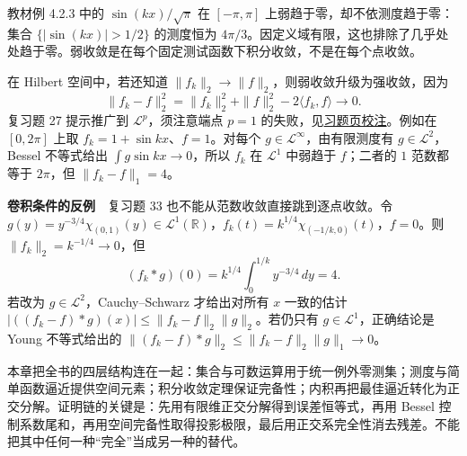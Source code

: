 \documentclass[11pt,a4paper]{article}
\begin{document}
教材例 4.2.3 中的 \(\sin(kx)/\sqrt\pi\) 在 \([-\pi,\pi]\)
上弱趋于零，却不依测度趋于零：集合 \(\{|\sin(kx)|>1/2\}\) 的测度恒为
\(4\pi/3\)。因定义域有限，这也排除了几乎处处趋于零。弱收敛是在每个固定测试函数下积分收敛，不是在每个点收敛。

在 Hilbert 空间中，若还知道
\(\|f_k\|_2\to\|f\|_2\)，则弱收敛升级为强收敛，因为 \[
\|f_k-f\|_2^2=\|f_k\|_2^2+\|f\|_2^2-2\langle f_k,f\rangle\longrightarrow0.
\] 复习题 27 提示推广到 \(\mathcal L^p\)，须注意端点 \(p=1\)
的失败，见\href{https://zj139.github.io/math-notes/notes/e1dec84d3fc9dd592c25bd52/\#原题校注}{习题页校注}。例如在
\([0,2\pi]\) 上取 \(f_k=1+\sin kx\)、\(f=1\)。对每个
\(g\in\mathcal L^\infty\)，由有限测度有 \(g\in\mathcal L^2\)，Bessel
不等式给出 \(\int g\sin kx\to0\)，所以 \(f_k\) 在 \(\mathcal L^1\)
中弱趋于 \(f\)；二者的 \(1\) 范数都等于 \(2\pi\)，但 \(\|f_k-f\|_1=4\)。

\textbf{卷积条件的反例}　复习题 33 也不能从范数收敛直接跳到逐点收敛。令
\(g(y)=y^{-3/4}\chi_{(0,1)}(y)\in\mathcal L^1(\mathbb R)\)，\(f_k(t)=k^{1/4}\chi_{(-1/k,0)}(t)\)，\(f=0\)。则
\(\|f_k\|_2=k^{-1/4}\to0\)，但 \[
(f_k*g)(0)=k^{1/4}\int_0^{1/k}y^{-3/4}\,dy=4.
\] 若改为 \(g\in\mathcal L^2\)，Cauchy--Schwarz 才给出对所有 \(x\)
一致的估计 \(|((f_k-f)*g)(x)|\le\|f_k-f\|_2\|g\|_2\)。若仍只有
\(g\in\mathcal L^1\)，正确结论是 Young 不等式给出的
\(\|(f_k-f)*g\|_2\le\|f_k-f\|_2\|g\|_1\to0\)。

本章把全书的四层结构连在一起：集合与可数运算用于统一例外零测集；测度与简单函数逼近提供空间元素；积分收敛定理保证完备性；内积再把最佳逼近转化为正交分解。证明链的关键是：先用有限维正交分解得到误差恒等式，再用
Bessel
控制系数尾和，再用空间完备性取得投影极限，最后用正交系完全性消去残差。不能把其中任何一种``完全''当成另一种的替代。
\end{document}
